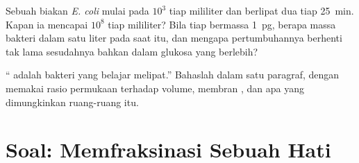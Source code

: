 \begin{exercise}[$\star\star\star$]\label{exo:b1:cell-unit-of-life:11}
Sebuah biakan \emph{E. coli} mulai pada $10^3$  tiap mililiter dan
berlipat dua tiap \qty{25}{min}. Kapan ia mencapai $10^8$ tiap
mililiter? Bila tiap  bermassa \qty{1}{pg}, berapa massa bakteri
dalam satu liter pada saat itu, dan mengapa pertumbuhannya berhenti tak
lama sesudahnya bahkan dalam glukosa yang berlebih?
\end{exercise}

\begin{exercise}[$\star\star\star$]\label{exo:b1:cell-unit-of-life:12}
`` adalah bakteri yang belajar melipat.'' Bahaslah dalam
satu paragraf, dengan memakai rasio permukaan terhadap volume, membran
, dan apa yang dimungkinkan ruang-ruang itu.
\end{exercise}

\section{Soal: Memfraksinasi Sebuah Hati}


